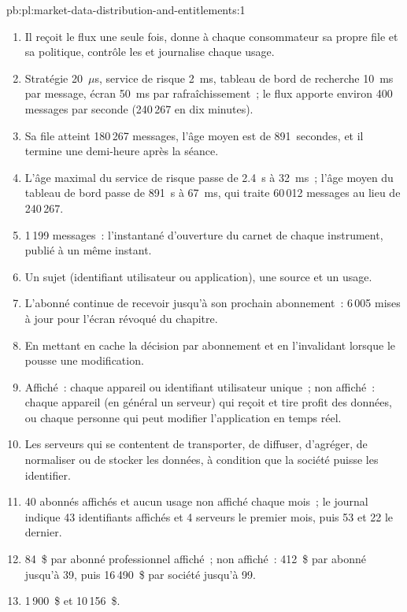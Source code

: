 \begin{solution}{pb:pl:market-data-distribution-and-entitlements:1}
\begin{enumerate}
\item Il reçoit le flux une seule fois, donne à chaque consommateur sa propre file et sa politique, contrôle les  et journalise chaque usage.
\item Stratégie 20~$\mu$s, service de risque 2~ms, tableau de bord de recherche 10~ms par message, écran 50~ms par rafraîchissement~; le flux apporte environ 400
messages par seconde (240\,267 en dix minutes).
\item Sa file atteint 180\,267 messages, l'âge moyen est de 891~secondes, et il termine une demi-heure après la séance.
\item L'âge maximal du service de risque passe de 2.4~s à 32~ms~; l'âge moyen du tableau de bord passe de 891~s à 67~ms, qui traite 60\,012 messages
au lieu de 240\,267.
\item 1\,199 messages~: l'instantané d'ouverture du carnet de chaque instrument, publié à un même instant.
\item Un sujet (identifiant utilisateur ou application), une source et un usage.
\item L'abonné continue de recevoir jusqu'à son prochain abonnement~: 6\,005 mises à jour pour l'écran révoqué du chapitre.
\item En mettant en cache la décision par abonnement et en l'invalidant lorsque le  pousse une modification.
\item Affiché~: chaque appareil ou identifiant utilisateur unique~; non affiché~: chaque appareil (en général un serveur) qui reçoit et tire profit des
données, ou chaque personne qui peut modifier l'application en temps réel.
\item Les serveurs qui se contentent de transporter, de diffuser, d'agréger, de normaliser ou de stocker les données, à condition que la société puisse les identifier.
\item 40 abonnés affichés et aucun usage non affiché chaque mois~; le journal indique 43 identifiants affichés et 4 serveurs le premier mois, puis 53
et 22 le dernier.
\item 84~\$ par abonné professionnel affiché~; non affiché~: 412~\$ par abonné jusqu'à 39, puis 16\,490~\$ par société jusqu'à 99.
\item 1\,900~\$ et 10\,156~\$.

\end{enumerate}
\end{solution}
